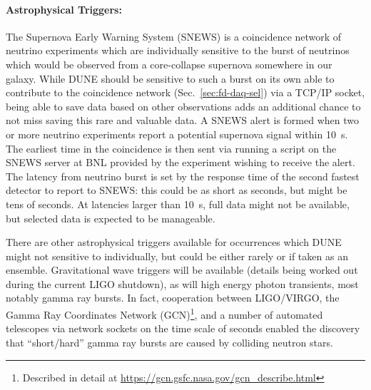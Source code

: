 \paragraph{Astrophysical Triggers:} The Supernova Early Warning System
(SNEWS) is a coincidence network of neutrino experiments which are
individually sensitive to the burst of neutrinos which would be observed
from a core-collapse supernova somewhere in our galaxy.  While DUNE
should be sensitive to such a burst on its own able to contribute to the
coincidence network (Sec.~\ref{sec:fd-daq-sel}) via a TCP/IP socket,
being able to save data based on other observations adds an additional
chance to not miss saving this rare and valuable data.  A SNEWS alert is
formed when two or more neutrino experiments report a potential
supernova signal within \SI{10}{\s}.  The earliest time in the
coincidence is then sent via running a script on the SNEWS server at BNL
provided by the experiment wishing to receive the alert.  The latency
from neutrino burst is set by the response time of the second fastest
detector to report to SNEWS: this could be as short as seconds, but
might be tens of seconds.  At latencies larger than \SI{10}{\s}, full
data might not be available, but selected data is expected to be manageable.

There are other astrophysical triggers available for occurrences which
DUNE might not sensitive to individually, but could be either rarely or
if taken as an ensemble.  Gravitational wave triggers will be available
(details being worked out during the current LIGO shutdown), as will
high energy photon transients, most notably gamma ray bursts.  In fact,
cooperation between LIGO/VIRGO, the Gamma Ray Coordinates Network
(GCN)\footnote{Described in detail at
  \url{https://gcn.gsfc.nasa.gov/gcn_describe.html}}, and a number of
automated telescopes via network sockets on the time scale of seconds
enabled the discovery that ``short/hard'' gamma ray bursts are caused by
colliding neutron stars\cite{kilonova}.

